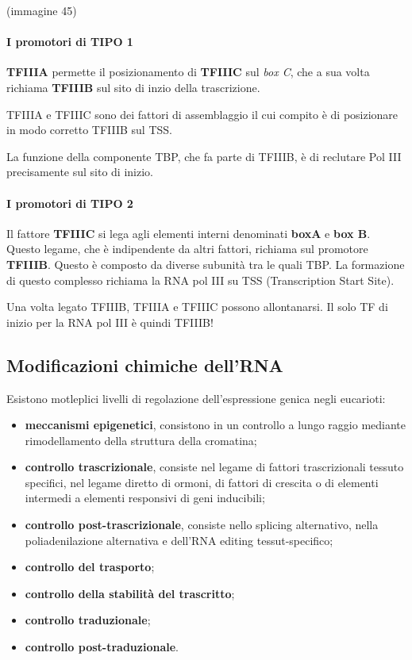 \documentclass[]{article}
\begin{document}
(immagine 45)

\paragraph{I promotori di TIPO 1}\label{i-promotori-di-tipo-1}

\textbf{TFIIIA} permette il posizionamento di \textbf{TFIIIC} sul
\emph{box C}, che a sua volta richiama \textbf{TFIIIB} sul sito di inzio
della trascrizione.

TFIIIA e TFIIIC sono dei fattori di assemblaggio il cui compito è di
posizionare in modo corretto TFIIIB sul TSS.

La funzione della componente TBP, che fa parte di TFIIIB, è di reclutare
Pol III precisamente sul sito di inizio.

\paragraph{I promotori di TIPO 2}\label{i-promotori-di-tipo-2}

Il fattore \textbf{TFIIIC} si lega agli elementi interni denominati
\textbf{boxA} e \textbf{box B}. Questo legame, che è indipendente da
altri fattori, richiama sul promotore \textbf{TFIIIB}. Questo è composto
da diverse subunità tra le quali TBP. La formazione di questo complesso
richiama la RNA pol III su TSS (Transcription Start Site).

Una volta legato TFIIIB, TFIIIA e TFIIIC possono allontanarsi. Il solo
TF di inizio per la RNA pol III è quindi TFIIIB!

\subsection{Modificazioni chimiche
dell'RNA}\label{modificazioni-chimiche-dellrna}

Esistono motleplici livelli di regolazione dell'espressione genica negli
eucarioti:

\begin{itemize}
\itemsep1pt\parskip0pt
\item
  \textbf{meccanismi epigenetici}, consistono in un controllo a lungo
  raggio mediante rimodellamento della struttura della cromatina;
\item
  \textbf{controllo trascrizionale}, consiste nel legame di fattori
  trascrizionali tessuto specifici, nel legame diretto di ormoni, di
  fattori di crescita o di elementi intermedi a elementi responsivi di
  geni inducibili;
\item
  \textbf{controllo post-trascrizionale}, consiste nello splicing
  alternativo, nella poliadenilazione alternativa e dell'RNA editing
  tessut-specifico;
\item
  \textbf{controllo del trasporto};
\item
  \textbf{controllo della stabilità del trascritto};
\item
  \textbf{controllo traduzionale};
\item
  \textbf{controllo post-traduzionale}.
\end{itemize}
\end{document}
